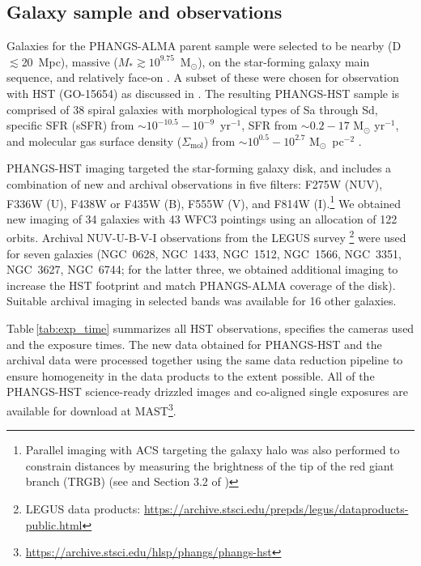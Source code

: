\documentclass[]{aastex631}
\newcommand{\msun}{M$_{\odot}$}
\newcommand{\sfr}{M$_{\odot}$ yr$^{-1}$}
\begin{document}
\subsection{Galaxy sample and observations}
Galaxies for the PHANGS-ALMA parent sample were selected to be nearby (D$\lesssim$20~Mpc), massive ($M_{*} \gtrsim 10^{9.75}$~\msun), on the star-forming galaxy main sequence, and relatively face-on \citep{leroy_phangs-alma_2021}.  A subset of these were chosen for observation with HST (GO-15654) as discussed in \citet{lee_phangs-hst_2022}. The resulting PHANGS-HST sample is comprised of 38 spiral galaxies with morphological types of Sa through Sd, specific SFR (sSFR) from ${\sim}10^{-10.5} {-} 10^{-9}$~yr$^{-1}$, SFR from ${\sim}0.2{-}17$ \sfr, and molecular gas surface density ($\Sigma_{\mbox{mol}}$) from ${\sim}10^{0.5}{-}10^{2.7}$ \msun~pc$^{-2}$ \citep[see ][Table 1 \& Figure 1]{lee_phangs-hst_2022}.

PHANGS-HST imaging targeted the star-forming galaxy disk, and includes a combination of new and archival observations in five filters: F275W (NUV), F336W (U), F438W or F435W (B), F555W (V), and F814W (I).\footnote{Parallel imaging with ACS targeting the galaxy halo was also performed to constrain distances by measuring the brightness of the tip of the red giant branch (TRGB) (see \citealt{anand_distances_2021} and Section 3.2 of \citealt{lee_phangs-hst_2022})} We obtained new imaging of 34 galaxies with 43 WFC3 pointings using an allocation of 122 orbits.  Archival NUV-U-B-V-I observations from the LEGUS survey \citep{calzetti_legacy_2015}\footnote{LEGUS data products: \url{https://archive.stsci.edu/prepds/legus/dataproducts-public.html}} were used for seven galaxies (NGC~0628, NGC~1433, NGC~1512, NGC~1566, NGC~3351, NGC~3627, NGC~6744; for the latter three, we obtained additional imaging to increase the HST footprint and match PHANGS-ALMA coverage of the disk).  Suitable archival imaging in selected bands was available for 16 other galaxies.

Table\,\ref{tab:exp_time} summarizes all HST observations, specifies the cameras used and the exposure times. The new data obtained for PHANGS-HST and the archival data were processed together using the same data reduction pipeline \citep[as summarized by][]{lee_phangs-hst_2022} to ensure homogeneity in the data products to the extent possible.  All of the PHANGS-HST science-ready drizzled images and co-aligned single exposures are available for download at MAST\footnote{\url{https://archive.stsci.edu/hlsp/phangs/phangs-hst}}. 
%

%
\end{document}

